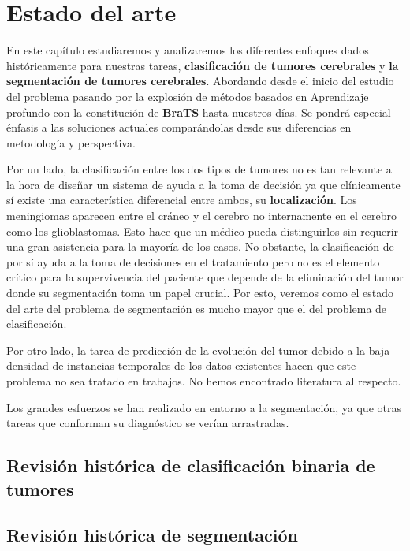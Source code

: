 \chapter{Estado del arte}

En este capítulo estudiaremos y analizaremos los diferentes enfoques dados históricamente para nuestras tareas, \textbf{clasificación de tumores cerebrales} y \textbf{la segmentación de tumores cerebrales}. Abordando desde el inicio del estudio del problema pasando por la explosión de métodos basados en Aprendizaje profundo con la constitución de \textbf{BraTS} hasta nuestros días. Se pondrá especial énfasis a las soluciones actuales comparándolas desde sus diferencias en metodología y perspectiva.

Por un lado, la clasificación entre los dos tipos de tumores no es tan relevante a la hora de diseñar un sistema de ayuda a la toma de decisión ya que clínicamente sí existe una característica diferencial entre ambos, su \textbf{localización}. Los meningiomas aparecen entre el cráneo y el cerebro no internamente en el cerebro como los glioblastomas. Esto hace que un médico pueda distinguirlos sin requerir una gran asistencia para la mayoría de los casos. No obstante, la clasificación de por sí ayuda a la toma de decisiones en el tratamiento pero no es el elemento crítico para la supervivencia del paciente que depende de la eliminación del tumor donde su segmentación toma un papel crucial. Por esto, veremos como el estado del arte del problema de segmentación es mucho mayor que el del problema de clasificación.

Por otro lado, la tarea de predicción de la evolución del tumor debido a la baja densidad de instancias temporales de los datos existentes hacen que este problema no sea tratado en trabajos. No hemos encontrado literatura al respecto. 

Los grandes esfuerzos se han realizado en entorno a la segmentación, ya que otras tareas que conforman su diagnóstico se verían arrastradas.

\section{Revisión histórica de clasificación binaria de tumores}

\section{Revisión histórica de segmentación}

